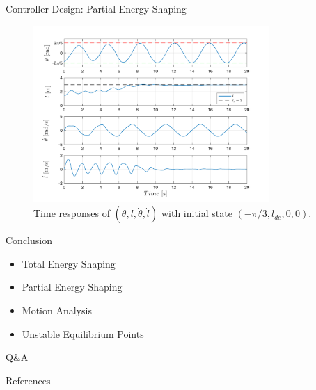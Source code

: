 \documentclass[10pt]{beamer}
\begin{document}
 \begin{frame}{Controller Design: Partial Energy Shaping}
    \begin{figure}
      \caption{Time responses of $(\theta, l, \dot{\theta}, \dot{l})$ with 
        initial state $(-\pi/3, l_{de}, 0, 0)$.}
      \vspace{-0.3cm}
      \includegraphics[width=0.8\textwidth]{images/partial_2b.pdf}
    \end{figure}
  \end{frame}

  \begin{frame}{Conclusion}
    \begin{itemize}
      \item Total Energy Shaping
      \item Partial Energy Shaping
      \item Motion Analysis
      \item Unstable Equilibrium Points
    \end{itemize}
  \end{frame}

  \begin{frame}[standout]
    Q\&A
  \end{frame}

  \appendix

  \begin{frame}{References}
    
    
  \end{frame}
\end{document}
